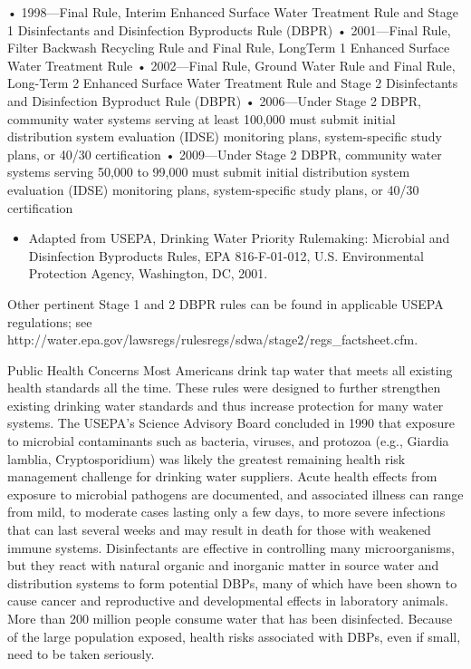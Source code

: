 \documentclass{article}
\begin{document}
• 1998---Final Rule, Interim Enhanced Surface Water Treatment Rule and
Stage 1 Disinfectants and Disinfection Byproducts Rule (DBPR) •
2001---Final Rule, Filter Backwash Recycling Rule and Final Rule,
LongTerm 1 Enhanced Surface Water Treatment Rule • 2002---Final Rule,
Ground Water Rule and Final Rule, Long-Term 2 Enhanced Surface Water
Treatment Rule and Stage 2 Disinfectants and Disinfection Byproduct Rule
(DBPR) • 2006---Under Stage 2 DBPR, community water systems serving at
least 100,000 must submit initial distribution system evaluation (IDSE)
monitoring plans, system-specific study plans, or 40/30 certification •
2009---Under Stage 2 DBPR, community water systems serving 50,000 to
99,000 must submit initial distribution system evaluation (IDSE)
monitoring plans, system-specific study plans, or 40/30 certification

\begin{itemize}
\tightlist
\item
  Adapted from USEPA, Drinking Water Priority Rulemaking: Microbial and
  Disinfection Byproducts Rules, EPA 816-F-01-012, U.S. Environmental
  Protection Agency, Washington, DC, 2001.
\end{itemize}

Other pertinent Stage 1 and 2 DBPR rules can be found in applicable
USEPA regulations; see
http://water.epa.gov/lawsregs/rulesregs/sdwa/stage2/regs\_factsheet.cfm.

Public Health Concerns Most Americans drink tap water that meets all
existing health standards all the time. These rules were designed to
further strengthen existing drinking water standards and thus increase
protection for many water systems. The USEPA's Science Advisory Board
concluded in 1990 that exposure to microbial contaminants such as
bacteria, viruses, and protozoa (e.g., Giardia lamblia, Cryptosporidium)
was likely the greatest remaining health risk management challenge for
drinking water suppliers. Acute health effects from exposure to
microbial pathogens are documented, and associated illness can range
from mild, to moderate cases lasting only a few days, to more severe
infections that can last several weeks and may result in death for those
with weakened immune systems. Disinfectants are effective in controlling
many microorganisms, but they react with natural organic and inorganic
matter in source water and distribution systems to form potential DBPs,
many of which have been shown to cause cancer and reproductive and
developmental effects in laboratory animals. More than 200 million
people consume water that has been disinfected. Because of the large
population exposed, health risks associated with DBPs, even if small,
need to be taken seriously.
\end{document}
